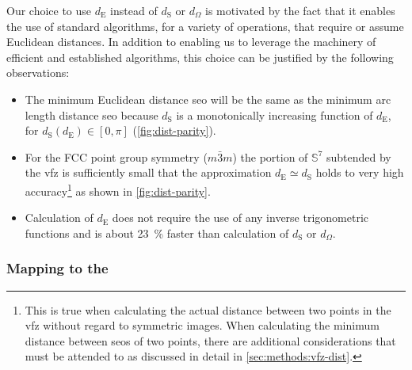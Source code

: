 \documentclass[final,twocolumn,12pt]{elsarticle}
\begin{document}
Our choice to use $d_{\text{E}}$ instead of $d_{\text{S}}$ or $d_\Omega$ is motivated by the fact that it enables the use of standard algorithms, for a variety of operations, that require or assume Euclidean distances. In addition to enabling us to leverage the machinery of efficient and established algorithms, this choice can be justified by the following observations:
\begin{itemize}
    \item The minimum Euclidean distance \gls{seo} will be the same as the minimum arc length distance \gls{seo} because $d_{\text{S}}$ is a monotonically increasing function of $d_{\text{E}}$, for $d_{\text{S}}\!\left(d_{\text{E}}\right)\in[0,\pi]$ (\cref{fig:dist-parity}). 
    \item For the FCC point group symmetry ($m\bar{3}m$) the portion of $\mathbb{S}^7$ subtended by the \gls{vfz} is sufficiently small that the approximation $d_{\text{E}} \simeq d_{\text{S}}$ holds to very high accuracy\footnote{This is true when calculating the actual distance between two points in the \gls{vfz} without regard to symmetric images. When calculating the minimum distance between \glspl{seo} of two points, there are additional considerations that must be attended to as discussed in detail in \cref{sec:methods:vfz-dist}.} as shown in \cref{fig:dist-parity}. 
    \item Calculation of $d_{\text{E}}$ does not require the use of any inverse trigonometric functions and is about \SI{23}{\percent} faster than calculation of $d_{\text{S}}$ or $d_\Omega$.
\end{itemize}

\subsubsection{Mapping  to the }
\label{sec:methods:proj}
\end{document}
